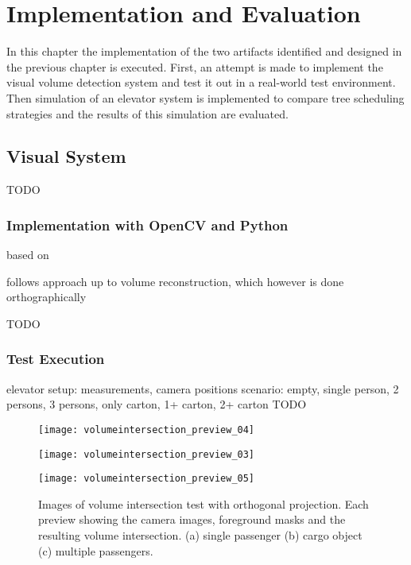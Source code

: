 \chapter{Implementation and Evaluation}
\label{chap:impl}

In this chapter the implementation of the two artifacts identified and designed in the previous chapter is executed.
First, an attempt is made to implement the visual volume detection system and test it out in a real-world test environment.
Then simulation of an elevator system is implemented to compare tree scheduling strategies and the results of this simulation are evaluated.


\section{Visual System}
TODO
\subsection{Implementation with OpenCV and Python}

based on \autocite[][]{xocoatzin2013voxelcarving}

follows approach up to volume reconstruction, which however is done orthographically

TODO
\subsection{Test Execution}
elevator setup: measurements, camera positions
scenario: empty, single person, 2 persons, 3 persons, only carton, 1+ carton, 2+ carton
TODO

\begin{figure}[p]
    \centering
    \texttt{[image: volumeintersection\_preview\_04]}
    
    \vspace{0.5em}
    
    \texttt{[image: volumeintersection\_preview\_03]}
    
    \vspace{0.5em}
    
    \texttt{[image: volumeintersection\_preview\_05]}
    
    \caption[Images of volume intersection test with orthogonal projection]{Images of volume intersection test with orthogonal projection. Each preview showing the camera images, foreground masks and the resulting volume intersection. (a) single passenger (b) cargo object (c) multiple passengers.}
    \label{fig:impl:preview}
\end{figure}

